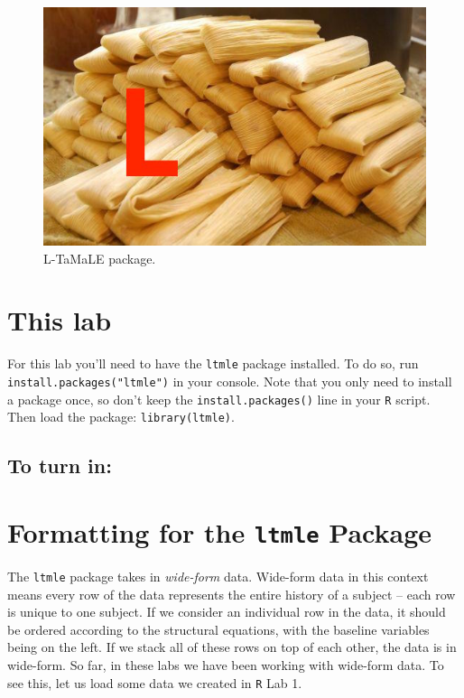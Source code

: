 \documentclass[answers]{exam}
\begin{document}
\begin{figure}
\begin{center}
\includegraphics[width=.4\textwidth]{tamale.jpg}
\caption{L-TaMaLE package.}
\end{center}
\end{figure}


\section{This lab}

For this lab you'll need to have the \texttt{ltmle} package installed. To do so, run \texttt{install.packages("ltmle")} in your console. Note that you only need to install a package once, so don't keep the \texttt{install.packages()} line in your \texttt{R} script. Then load the package: \texttt{library(ltmle)}.

\subsection{To turn in:}


\noindent{}
\section{Formatting for the \texttt{ltmle} Package}

The \texttt{ltmle} package takes in \textit{wide-form} data. Wide-form data in this context means every row of the data represents the entire history of a subject -- each row is unique to one subject. If we consider an individual row in the data, it should be ordered according to the structural equations, with the baseline variables being on the left. If we stack all of these rows on top of each other, the data is in wide-form. So far, in these labs we have been working with wide-form data. To see this, let us load some data we created in \texttt{R} Lab 1.
\end{document}
